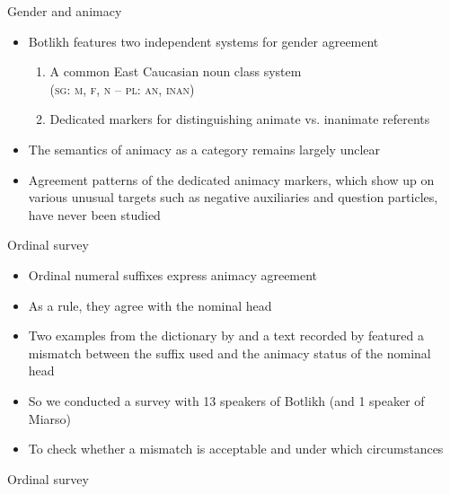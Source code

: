 \begin{frame}{Gender and animacy}
\begin{itemize}
    \item Botlikh features two independent systems for gender agreement
    \begin{enumerate}
        \item A common East Caucasian noun class system\\ (\textsc{sg}: \textsc{m}, \textsc{f}, \textsc{n} -- \textsc{pl}: \textsc{an}, \textsc{inan})
        \item Dedicated markers for distinguishing animate vs. inanimate referents
    \end{enumerate}
  \item The semantics of animacy as a category remains largely unclear
  \item Agreement patterns of the dedicated animacy markers, which show up on various unusual targets such as negative auxiliaries and question particles, have never been studied
\end{itemize}
\end{frame}

\begin{frame}{Ordinal survey}
\begin{itemize}
    \item Ordinal numeral suffixes express animacy agreement
    \item As a rule, they agree with the nominal head
    \item Two examples from the dictionary by \citep{saidovaabusov2012} and a text recorded by \citep{gudava1962} featured a mismatch between the suffix used and the animacy status of the nominal head
    \pause
    \item So we conducted a survey with 13 speakers of Botlikh (and 1 speaker of Miarso)
    \item To check whether a mismatch is acceptable and under which circumstances
\end{itemize}
\end{frame}


\begin{frame}{Ordinal survey}


\end{frame}



